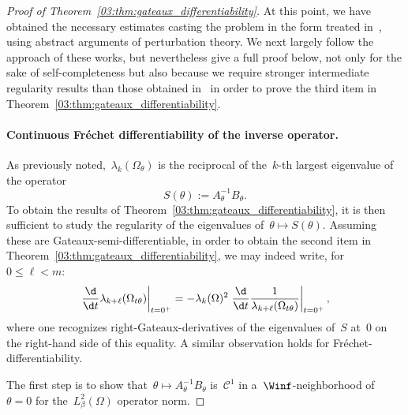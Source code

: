 \begin{proof}[Proof of Theorem~\ref{03:thm:gateaux_differentiability}]
    At this point, we have obtained the necessary estimates casting the problem in the form treated in~\cite{HR80a,HR80b}, using abstract arguments of perturbation theory. We next largely follow the approach of these works, but nevertheless give a full proof below, not only for the sake of self-completeness but also because we require stronger intermediate regularity results than those obtained in~\cite{HR80a} in order to prove the third item in Theorem~\ref{03:thm:gateaux_differentiability}.
    \paragraph{Continuous Fréchet differentiability of the inverse operator.}
    As previously noted,~$\lambda_k(\Omega_\theta)$ is the reciprocal of the~$k$-th largest eigenvalue of the operator
    $$S(\theta) := A_\theta^{-1}B_\theta.$$
    To obtain the results of Theorem~\ref{03:thm:gateaux_differentiability}, it is then sufficient to study the regularity of the eigenvalues of~$\theta\mapsto S(\theta)$.
    Assuming these are Gateaux-semi-differentiable, in order to obtain the second item in Theorem~\ref{03:thm:gateaux_differentiability}, we may indeed write, for~$0\leq \ell<m$:
    \begin{equation}
        \label{03:eq:lambda_quotient_rule}
    \left.\frac{\d}{\d t}\lambda_{k+\ell}(\Omega_{t\theta})\right|_{t=0^+} = -\lambda_k(\Omega)^2 \left.\frac{\d}{\d t}\frac{1}{\lambda_{k+\ell}(\Omega_{t\theta})}\right|_{t=0^+},
    \end{equation}
    where one recognizes right-Gateaux-derivatives of the eigenvalues of~$S$ at~$0$ on the right-hand side of this equality. A similar observation holds for Fréchet-differentiability.

    The first step is to show that~$\theta\mapsto A_\theta^{-1}B_\theta$ is~$\mathcal C^1$ in a~$\Winf$-neighborhood of~$\theta=0$ for the~$L^2_\beta(\Omega)$ operator norm. 
    

\end{proof}
